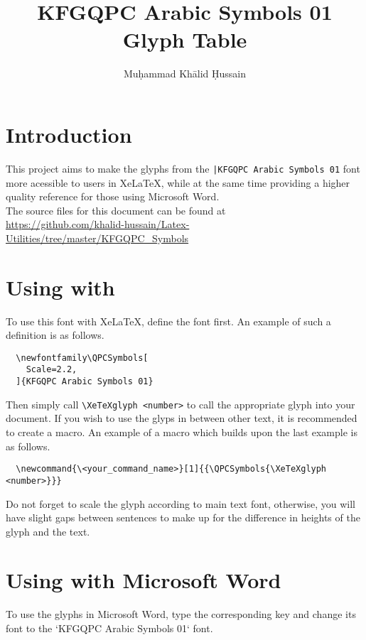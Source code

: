 \documentclass[14pt]{article}
\author{Muḥammad Khālid Ḥussain}
\title{KFGQPC Arabic Symbols 01 Glyph Table}
\date{\Hijritoday[1]}
\begin{document}
\maketitle

\section{Introduction}

This project aims to make the glyphs from the \verb$|KFGQPC Arabic Symbols 01$ font more acessible to users in XeLaTeX, while at the same time providing a higher quality reference for those using Microsoft Word.\\

The source files for this document can be found at\\
\url{https://github.com/khalid-hussain/Latex-Utilities/tree/master/KFGQPC_Symbols}

\section{Using with \XeLaTeX{}}

To use this font with XeLaTeX, define the font first. An example of such a definition is as follows.

  \begin{verbatim}
  \newfontfamily\QPCSymbols[
    Scale=2.2,
  ]{KFGQPC Arabic Symbols 01}
  \end{verbatim}

Then simply call \verb$\XeTeXglyph <number>$ to call the appropriate glyph into your document. If you wish to use the glyps in between other text, it is recommended to create a macro. An example of a macro which builds upon the last example is as follows.

  \begin{verbatim}
  \newcommand{\<your_command_name>}[1]{{\QPCSymbols{\XeTeXglyph <number>}}}
  \end{verbatim}

Do not forget to scale the glyph according to main text font, otherwise, you will have slight gaps between sentences to make up for the difference in heights of the glyph and the text.

\section{Using with Microsoft Word}

To use the glyphs in Microsoft Word, type the corresponding key and change its font to the 
`KFGQPC Arabic Symbols 01` font.\\
\end{document}
